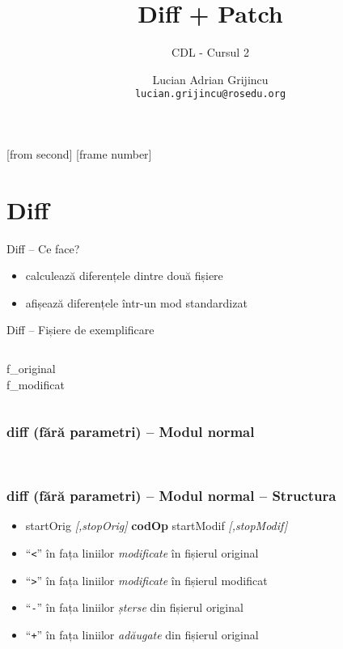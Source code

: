 \documentclass{beamer}
\title[Diff \+ Patch]{Diff + Patch}
\subtitle{CDL - Cursul 2}
\institute{ROSEdu}
\author{Lucian Adrian Grijincu \\ \texttt{lucian.grijincu@rosedu.org}}
\begin{document}
[from second]
[frame number]

\frame{\titlepage}

\frame{\tableofcontents}

\section{Diff}

\frame{\tableofcontents[currentsection]}

\begin{frame}{Diff – Ce face?}
\begin{itemize} %
  \item calculează diferențele dintre două fișiere
  \item afișează diferențele într-un mod standardizat
\end{itemize}
\end{frame}


\begin{frame}{Diff – Fișiere de exemplificare}
  \begin{columns}[t]
    \column{5cm}
    {\LARGE{f\_original}}\\
    {\tt{\small }}
    \column{5cm}
    {\LARGE{f\_modificat}}\\
    {\tt \small }
  \end{columns}
\end{frame}

\begin{frame}
  \frametitle{\textbf{diff} (fără parametri) – Modul normal}
  \tt 
\end{frame}

\begin{frame}
  \frametitle{\textbf{diff} (fără parametri) – Modul normal – Structura}
  \begin{itemize}
    \item startOrig \textit{[,stopOrig]} \textbf{codOp} startModif \textit{[,stopModif]}
    \item ``\texttt{\textless}'' în fața liniilor \textit{modificate} în fișierul original
    \item ``\texttt{\textgreater}'' în fața liniilor \textit{modificate} în fișierul modificat
    \item ``\texttt{-}'' în fața liniilor \textit{șterse} din fișierul original
    \item ``\texttt{+}'' în fața liniilor \textit{adăugate} din fișierul original
  \end{itemize}
\end{frame}
\end{document}
